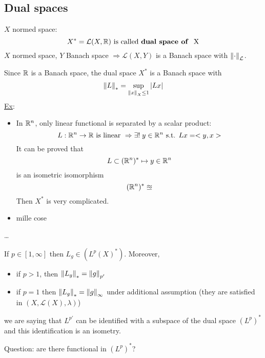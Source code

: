 \subsection*{Dual spaces}
\(X\) normed space: 
\[
    X^* = \mathcal{L}(X, \mathbb{R}) \mbox{ is called \textbf{dual space of } X}
\]
\(X\) normed space, \(Y\) Banach space \(\Rightarrow \mathcal{L}(X, Y)\) is a Banach space with \(\norm{\cdot}_{\mathcal{L}}\).

Since \(\mathbb{R}\) is a Banach space, the dual space \(X^*\) is a Banach space with 
\[
    \norm{L}_* = \sup_{\norm{x}_X \leq 1} \abs{Lx}
\]
\underline{Ex}: 
\begin{itemize}
    \item In \(\mathbb{R}^n\), only linear functional is separated by a scalar product:
        \[
            L : \mathbb{R}^n \to \mathbb{R} \mbox{ is linear } \Rightarrow \exists ! \; y \in \mathbb{R}^n \mbox{ s.t. } Lx = <y,x>
        \]
        It can be proved that 
        \[
            L \subset (\mathbb{R}^n)^* \mapsto y \in \mathbb{R}^n
        \]
        is an isometric isomorphism 
        \[
            (\mathbb{R}^n)^* \approxeq 
        \]
        Then \(X^*\) is very complicated.
    \item mille cose 
\end{itemize}

\dots

\begin{proposition}
    If \(p \in [1, \infty]\) then \(L_g \in (L^p(X)^*)\). Moreover, 
    \begin{itemize}
        \item if \(p > 1\), then \(\norm{L_g}_* = \norm{g}_{p'}\)
        \item if \(p=1\) then \(\norm{L_g}_* = \norm{g}_{\infty}\) under additional assumption (they are satisfied in \((X, \mathcal{L}(X), \lambda)\))
    \end{itemize}
\end{proposition}

\begin{remark}
    we are saying that \(L^{p'}\) can be identified with a subspace of the dual space \((L^p)^*\) and this identification is an isometry.
\end{remark}

Question: are there functional in \((L^p)^*\)?

